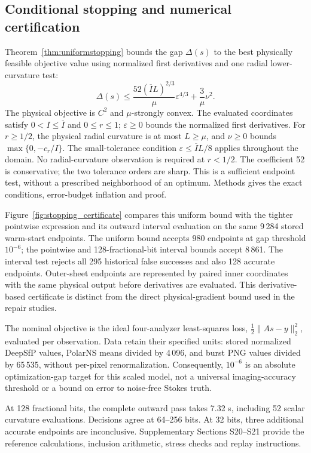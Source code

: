 \documentclass[10pt,a4paper]{article}
\begin{document}
\subsection{Conditional stopping and numerical certification}
\label{sec:certificate_results}
Theorem~\ref{thm:uniformstopping} bounds the gap $\Delta(s)$ to the best physically feasible objective value using normalized first derivatives and one radial lower-curvature test:
\[
 \Delta(s)\leq\frac{52(\overline I L)^{2/3}}{\mu}\varepsilon^{4/3}
             +\frac{3}{\mu}\nu^2.
\]
The physical objective is $C^2$ and $\mu$-strongly convex. The evaluated coordinates satisfy $0<I\leq\overline I$ and $0\leq r\leq1$; $\varepsilon\geq0$ bounds the normalized first derivatives. For $r\geq1/2$, the physical radial curvature is at most $L\geq\mu$, and $\nu\geq0$ bounds $\max\{0,-c_r/I\}$. The small-tolerance condition $\varepsilon\leq\overline I L/8$ applies throughout the domain. No radial-curvature observation is required at $r<1/2$. The coefficient 52 is conservative; the two tolerance orders are sharp. This is a sufficient endpoint test, without a prescribed neighborhood of an optimum. Methods gives the exact conditions, error-budget inflation and proof.

Figure~\ref{fig:stopping_certificate} compares this uniform bound with the tighter pointwise expression and its outward interval evaluation on the same 9\,284 stored warm-start endpoints. The uniform bound accepts 980 endpoints at gap threshold $10^{-6}$; the pointwise and 128-fractional-bit interval bounds accept 8\,861. The interval test rejects all 295 historical false successes and also 128 accurate endpoints. Outer-sheet endpoints are represented by paired inner coordinates with the same physical output before derivatives are evaluated. This derivative-based certificate is distinct from the direct physical-gradient bound used in the repair studies.

The nominal objective is the ideal four-analyzer least-squares loss, $\tfrac12\|As-y\|_2^2$, evaluated per observation. Data retain their specified units: stored normalized DeepSfP values, PolarNS means divided by 4\,096, and burst PNG values divided by 65\,535, without per-pixel renormalization. Consequently, $10^{-6}$ is an absolute optimization-gap target for this scaled model, not a universal imaging-accuracy threshold or a bound on error to noise-free Stokes truth.

At 128 fractional bits, the complete outward pass takes 7.32 s, including 52 scalar curvature evaluations. Decisions agree at 64--256 bits. At 32 bits, three additional accurate endpoints are inconclusive. Supplementary Sections S20--S21 provide the reference calculations, inclusion arithmetic, stress checks and replay instructions.
\end{document}
